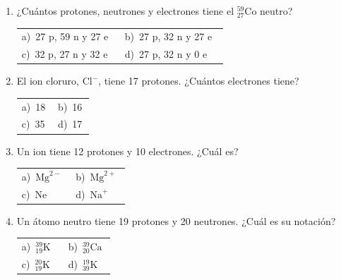 \documentclass[11pt,a4paper]{article}
\begin{document}
\begin{enumerate}[label=\textbf{\arabic*.},leftmargin=*,itemsep=11pt,topsep=0pt]
\item \begin{minipage}[t]{\linewidth}
¿Cuántos protones, neutrones y electrones tiene el ${}^{59}_{27}\mathrm{Co}$ neutro?

\vspace{5pt}
\begin{tabular}{@{}p{0.47\linewidth}p{0.47\linewidth}@{}}
a)~27 p, 59 n y 27 e & b)~27 p, 32 n y 27 e \\
c)~32 p, 27 n y 32 e & d)~27 p, 32 n y 0 e \\
\end{tabular}
\end{minipage}

\item \begin{minipage}[t]{\linewidth}
El ion cloruro, $\mathrm{Cl}^{-}$, tiene 17 protones. ¿Cuántos electrones tiene?

\vspace{5pt}
\begin{tabular}{@{}p{0.47\linewidth}p{0.47\linewidth}@{}}
a)~18 & b)~16 \\
c)~35 & d)~17 \\
\end{tabular}
\end{minipage}

\item \begin{minipage}[t]{\linewidth}
Un ion tiene 12 protones y 10 electrones. ¿Cuál es?

\vspace{5pt}
\begin{tabular}{@{}p{0.47\linewidth}p{0.47\linewidth}@{}}
a)~$\mathrm{Mg}^{2-}$ & b)~$\mathrm{Mg}^{2+}$ \\
c)~$\mathrm{Ne}$ & d)~$\mathrm{Na}^{+}$ \\
\end{tabular}
\end{minipage}

\item \begin{minipage}[t]{\linewidth}
Un átomo neutro tiene 19 protones y 20 neutrones. ¿Cuál es su notación?

\vspace{5pt}
\begin{tabular}{@{}p{0.47\linewidth}p{0.47\linewidth}@{}}
a)~${}^{39}_{19}\mathrm{K}$ & b)~${}^{39}_{20}\mathrm{Ca}$ \\
c)~${}^{20}_{19}\mathrm{K}$ & d)~${}^{19}_{39}\mathrm{K}$ \\
\end{tabular}
\end{minipage}


\end{enumerate}
\end{document}
